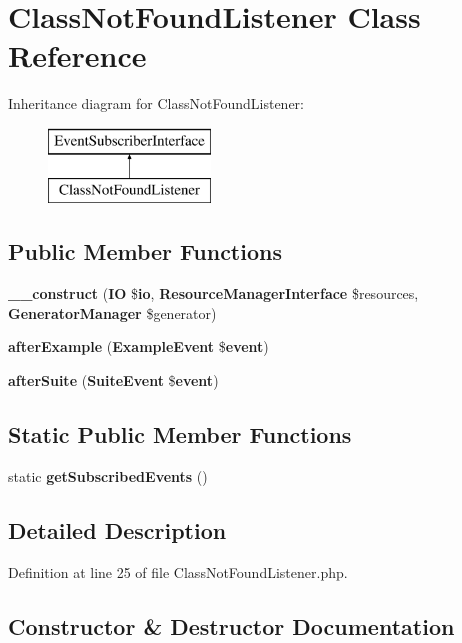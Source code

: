 \section{Class\+Not\+Found\+Listener Class Reference}
\label{class_php_spec_1_1_listener_1_1_class_not_found_listener}
Inheritance diagram for Class\+Not\+Found\+Listener\+:\begin{figure}[H]
\begin{center}
\leavevmode
\includegraphics[height=2.000000cm]{class_php_spec_1_1_listener_1_1_class_not_found_listener}
\end{center}
\end{figure}
\subsection*{Public Member Functions}
\begin{DoxyCompactItemize}
\item 
{\bf \+\_\+\+\_\+construct} ({\bf I\+O} \${\bf io}, {\bf Resource\+Manager\+Interface} \$resources, {\bf Generator\+Manager} \$generator)
\item 
{\bf after\+Example} ({\bf Example\+Event} \${\bf event})
\item 
{\bf after\+Suite} ({\bf Suite\+Event} \${\bf event})
\end{DoxyCompactItemize}
\subsection*{Static Public Member Functions}
\begin{DoxyCompactItemize}
\item 
static {\bf get\+Subscribed\+Events} ()
\end{DoxyCompactItemize}


\subsection{Detailed Description}


Definition at line 25 of file Class\+Not\+Found\+Listener.\+php.



\subsection{Constructor \& Destructor Documentation}
